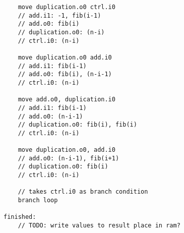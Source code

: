 \documentclass[adraft]{eptcs}
\begin{document}
\begin{appendices}
\begin{lstlisting}
	move duplication.o0 ctrl.i0
	// add.i1: -1, fib(i-1)
	// add.o0: fib(i)
	// duplication.o0: (n-i)
	// ctrl.i0: (n-i)
	
	move duplication.o0 add.i0
	// add.i1: fib(i-1)
	// add.o0: fib(i), (n-i-1)
	// ctrl.i0: (n-i)
	
	move add.o0, duplication.i0
	// add.i1: fib(i-1)
	// add.o0: (n-i-1)
	// duplication.o0: fib(i), fib(i)
	// ctrl.i0: (n-i)

	move duplication.o0, add.i0
	// add.o0: (n-i-1), fib(i+1)
	// duplication.o0: fib(i)
	// ctrl.i0: (n-i)
	
	// takes ctrl.i0 as branch condition
	branch loop

finished:
	// TODO: write values to result place in ram?
			\end{lstlisting}
	
	\end{appendices}
	
\end{document}
